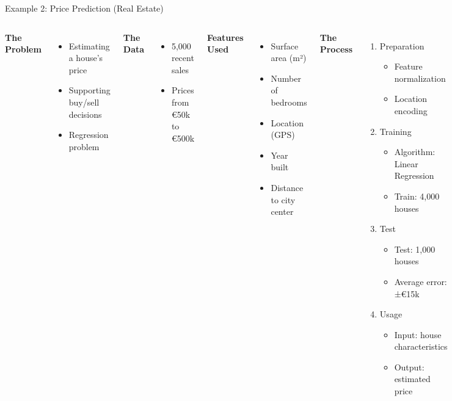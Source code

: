 \documentclass[12pt,aspectratio=169]{beamer}
\begin{document}
\begin{frame}{Example 2: Price Prediction (Real Estate)}
\begin{columns}[T]
\textbf{The Problem}
\begin{itemize}
\item Estimating a house's price
\item Supporting buy/sell decisions
\item Regression problem
\end{itemize}


\textbf{The Data}
\begin{itemize}
\item 5,000 recent sales
\item Prices from €50k to €500k
\end{itemize}



\textbf{Features Used}
\begin{itemize}
\item Surface area (m²)
\item Number of bedrooms
\item Location (GPS)
\item Year built
\item Distance to city center
\end{itemize}

\textbf{The Process}
\begin{enumerate}
\item Preparation
\begin{itemize}
\item Feature normalization
\item Location encoding
\end{itemize}

\item Training
\begin{itemize}
\item Algorithm: Linear Regression
\item Train: 4,000 houses
\end{itemize}

\item Test
\begin{itemize}
\item Test: 1,000 houses
\item Average error: ±€15k
\end{itemize}

\item Usage
\begin{itemize}
\item Input: house characteristics
\item Output: estimated price
\end{itemize}
\end{enumerate}
\end{columns}
\end{frame}
\end{document}
